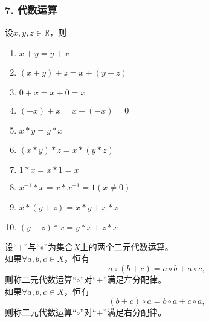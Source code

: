 \documentclass{beamer}
\begin{document}
\begin{CJK*}{UTF8}{gbsn}
\begin{frame}
  \frametitle{7. 代数运算}
  \begin{minipage}[t]{0.49\linewidth}
  \begin{block}{}
    设$x, y, z \in \mathbb{R}$，则
   \begin{enumerate}
   \item   $x + y = y + x$
   \item   $(x + y) + z = x + (y + z)$
   \item   $0 + x = x + 0 = x$
   \item   $(-x) + x = x + (-x) = 0$
   \item   $x * y = y * x$
   \item   $(x * y) * z = x * (y *z)$
   \item   $1 * x = x * 1 = x$
   \item   $x^{-1} * x = x * x^{-1} = 1(x\neq 0)$
   \item   $x* (y + z) = x * y + x * z$
   \item   $(y + z) * x = y * x + z * x$
    \end{enumerate}
  \end{block}\pause
\end{minipage}
\begin{minipage}[t]{0.49\linewidth}
  \begin{Def}
    设“$+$”与“$\circ$”为集合$X$上的两个二元代数运算。\\如果$\forall a, b, c \in X$，恒有\[a \circ (b + c) = a \circ b + a \circ c,\] 则称二元代数运算“$\circ$”对“$+$”满足\alert{左分配律}。
    \\如果$\forall a, b, c \in X$，恒有\[(b + c)\circ a = b \circ a + c \circ a,\] 则称二元代数运算“$\circ$”对“$+$”满足\alert{右分配律}。
  \end{Def}
\end{minipage}
\end{frame}


\end{CJK*}
\end{document}
